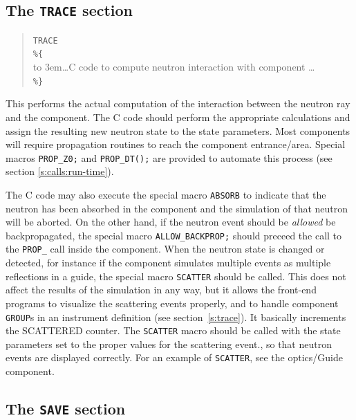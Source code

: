 \subsection{The \texttt{TRACE} section}
\label{s:comp-trace}

\begin{quote}
  \texttt{TRACE} \\
  \verb|%{| \\
  \hbox to 3em{}\ldots C code to compute neutron interaction with
    component \ldots \\
  \verb|%}|
\end{quote}
This performs the actual computation of the interaction between the
neutron ray and the component. The C code should perform the appropriate
calculations and assign the resulting new neutron state to the state
parameters. Most components will require propagation routines to reach the component entrance/area. Special macros \verb+PROP_Z0;+ and \verb+PROP_DT();+ are provided to automate this process (see section \ref{s:calls:run-time}).

The C code may also execute the special macro \texttt{ABSORB} to indicate
that the neutron has been absorbed in the component and the simulation of
that neutron will be aborted. On the other hand, if the neutron event
should be \emph{allowed} be backpropagated, the special macro
\verb+ALLOW_BACKPROP;+ should preceed the call to the \verb+PROP_+
call inside the component.
When the neutron state is changed or detected, for
instance if the component simulates multiple events as multiple
reflections in a guide, the
special macro \texttt{SCATTER} should be called. This does not affect the
results of the simulation in any way, but it allows the front-end
programs to visualize the scattering events properly, and to handle
component \texttt{GROUP}s in an instrument definition (see
section~\ref{s:trace}). It basically increments the SCATTERED counter. The \texttt{SCATTER} macro should be called with
the state parameters set to the proper values for the scattering event., so that neutron events are displayed correctly.
For an example of \texttt{SCATTER}, see the optics/Guide
component. 


\subsection{The \texttt{SAVE} section}
\label{s:comp-save}

